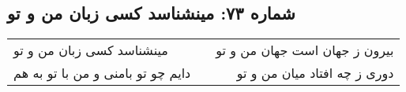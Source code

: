 \begin{center}
\section*{شماره ۷۳: مینشناسد کسی زبان من و تو}
\label{sec:073}
\begin{longtable}{l p{0.5cm} r}
مینشناسد کسی زبان من و تو
&&
بیرون ز جهان است جهان من و تو
\\
دایم چو تو بامنی و من با تو به هم
&&
دوری ز چه افتاد میان من و تو
\\
\end{longtable}
\end{center}
